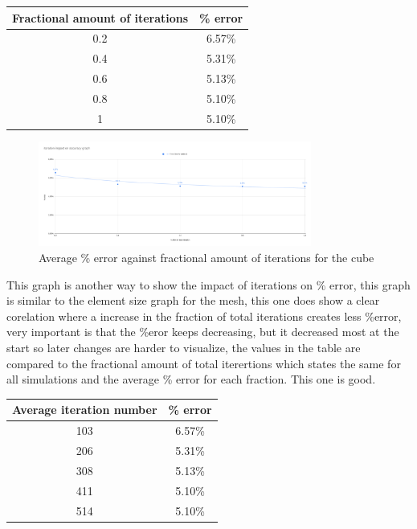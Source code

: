 \documentclass[12pt,a4paper]{article}
\begin{document}
\begin{table}[H]
\centering
\begin{tabular}{|c|c|}
\hline
\textbf{Fractional amount of iterations} & \textbf{\% error} \\
\hline
0.2 & 6.57\% \\
\hline
0.4 & 5.31\% \\
\hline
0.6 & 5.13\% \\
\hline
0.8 & 5.10\% \\
\hline
1 & 5.10\% \\
\hline
\end{tabular}
\end{table}

\begin{figure}[H]
\centering
\includegraphics[width=0.8\textwidth]{image5.png}
\caption{Average \% error against fractional amount of iterations for the cube}
\end{figure}

This graph is another way to show the impact of iterations on \% error, this graph is similar to the element size graph for the mesh, this one does show a clear corelation where a increase in the fraction of total iterations creates less \%error, very important is that the \%eror keeps decreasing, but it decreased most at the start so later changes are harder to visualize, the values in the table are compared to the fractional amount of total iterertions which states the same for all simulations and the average \% error for each fraction. This one is good.

\begin{table}[H]
\centering
\begin{tabular}{|c|c|}
\hline
\textbf{Average iteration number} & \textbf{\% error} \\
\hline
103 & 6.57\% \\
\hline
206 & 5.31\% \\
\hline
308 & 5.13\% \\
\hline
411 & 5.10\% \\
\hline
514 & 5.10\% \\
\hline
\end{tabular}
\end{table}
\end{document}

